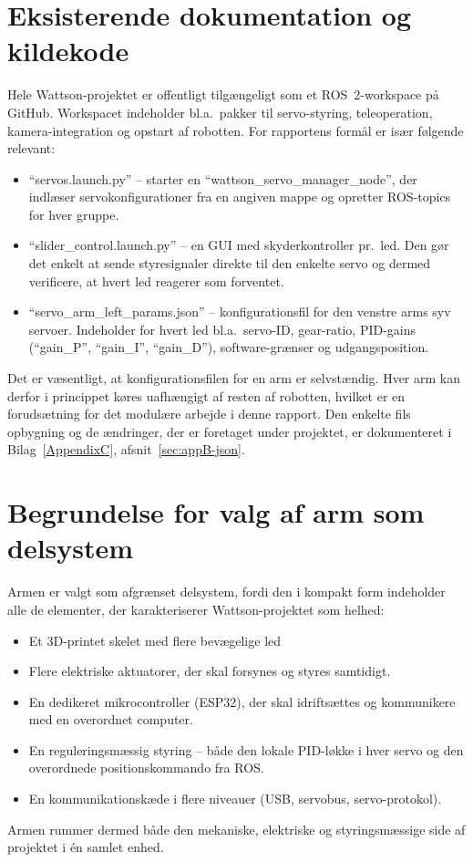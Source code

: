 \section{Eksisterende dokumentation og kildekode}
\label{sec:doks-kode}

Hele Wattson-projektet er offentligt tilgængeligt som et ROS~2-workspace
på GitHub. Workspacet indeholder bl.a.\ pakker til servo-styring,
teleoperation, kamera-integration og opstart af robotten. For rapportens
formål er især følgende relevant:

\begin{itemize}
    \item \enquote{servos.launch.py} -- starter en
          \enquote{wattson\_servo\_manager\_node}, der indlæser
          servokonfigurationer fra en angiven mappe og opretter
          ROS-topics for hver gruppe.
    \item \enquote{slider\_control.launch.py} -- en GUI med skyderkontroller
          pr.\ led. Den gør det enkelt at sende styresignaler direkte
          til den enkelte servo og dermed verificere, at hvert led
          reagerer som forventet.
    \item \enquote{servo\_arm\_left\_params.json} -- konfigurationsfil for
          den venstre arms syv servoer. Indeholder for hvert led bl.a.\
          servo-ID, gear-ratio, PID-gains (\enquote{gain\_P},
          \enquote{gain\_I}, \enquote{gain\_D}), software-grænser og
          udgangsposition.
\end{itemize}

Det er væsentligt, at konfigurationsfilen for en arm er selvstændig.
Hver arm kan derfor i princippet køres uafhængigt af resten af robotten,
hvilket er en forudsætning for det modulære arbejde i denne rapport.
Den enkelte fils opbygning og de ændringer, der er foretaget under
projektet, er dokumenteret i Bilag~\ref{AppendixC},
afsnit~\ref{sec:appB-json}.

\section{Begrundelse for valg af arm som delsystem}

Armen er valgt som afgrænset delsystem, fordi den i kompakt form
indeholder alle de elementer, der karakteriserer Wattson-projektet som
helhed:

\begin{itemize}
    \item Et 3D-printet skelet med flere bevægelige led
    \item Flere elektriske aktuatorer, der skal forsynes og styres
          samtidigt.
    \item En dedikeret mikrocontroller (ESP32), der skal idriftsættes
          og kommunikere med en overordnet computer.
    \item En reguleringsmæssig styring -- både den lokale PID-løkke i
          hver servo og den overordnede positionskommando fra ROS.
    \item En kommunikationskæde i flere niveauer (USB, servobus,
          servo-protokol).
\end{itemize}

\noindent Armen rummer dermed både den mekaniske, elektriske og
styringsmæssige side af projektet i én samlet enhed.
